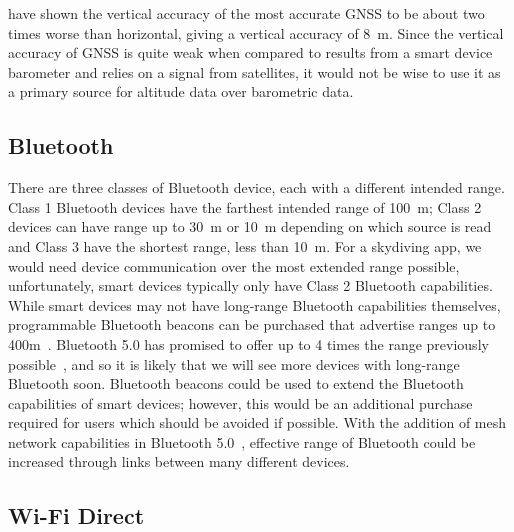 \documentclass[11pt, twocolumn]{article}
\begin{document}
\textcite{kaplan_understanding_2005} have shown the vertical accuracy of the most accurate GNSS to be about two times worse than horizontal, giving a vertical accuracy of \SI{8}{\metre}. Since the vertical accuracy of GNSS is quite weak when compared to results from a smart device barometer and relies on a signal from satellites, it would not be wise to use it as a primary source for altitude data over barometric data.

\subsection{Bluetooth}\label{sec:bluetooth} %

There are three classes of Bluetooth device, each with a different intended range. Class 1 Bluetooth devices have the farthest intended range of \SI{100}{\metre}; Class 2 devices can have range up to \SI{30}{\metre} or \SI{10}{\metre} depending on which source is read~\cite{noauthor_bluetooth_nodate, wright_dispelling_nodate} and Class 3 have the shortest range, less than \SI{10}{\metre}.
For a skydiving app, we would need device communication over the most extended range possible, unfortunately, smart devices typically only have Class 2 Bluetooth capabilities. While smart devices may not have long-range Bluetooth capabilities themselves, programmable Bluetooth beacons can be purchased that advertise ranges up to 400m~\cite{noauthor_coin_nodate}. Bluetooth 5.0 has promised to offer up to 4 times the range previously possible~\cite{bluetooth_sig_inc_rethinking_nodate}, and so it is likely that we will see more devices with long-range Bluetooth soon. Bluetooth beacons could be used to extend the Bluetooth capabilities of smart devices; however, this would be an additional purchase required for users which should be avoided if possible. With the addition of mesh network capabilities in Bluetooth 5.0~\cite{noauthor_mesh_nodate}, effective range of Bluetooth could be increased through links between many different devices.

\subsection{Wi-Fi Direct}\label{sec:wifi-direct} %
\end{document}
